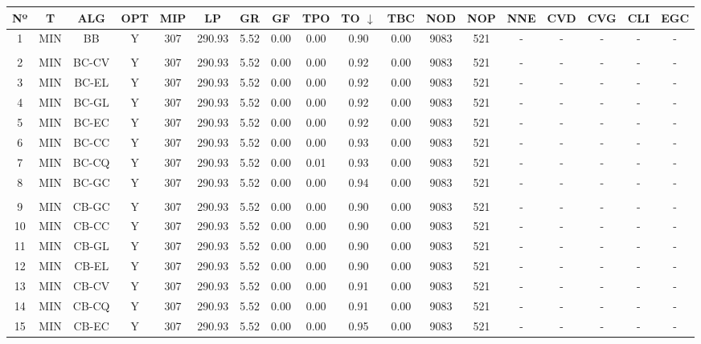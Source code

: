 {
\footnotesize\centering
\hspace*{-5mm}\begin{tabular}{ *{17}{c|} c }
\hline
\textbf{Nº} & \textbf{T} & \textbf{ALG} & \textbf{OPT} & \textbf{MIP} & \textbf{LP} & \textbf{GR} & \textbf{GF} & \textbf{TPO} & \textbf{TO} $\downarrow$ & \textbf{TBC} & \textbf{NOD} & \textbf{NOP} & \textbf{NNE} & \textbf{CVD} & \textbf{CVG} & \textbf{CLI} & \textbf{EGC}\\
\hline
1 & MIN & BB & Y & 307 & 290.93 & 5.52 & 0.00 & 0.00 & 0.90 & 0.00 & 9083 & 521 & - & - & - & - & -\\
\hline
\multicolumn{18}{c}{}
\\
\hline
2 & MIN & BC-CV & Y & 307 & 290.93 & 5.52 & 0.00 & 0.00 & 0.92 & 0.00 & 9083 & 521 & - & - & - & - & -\\
\hline
3 & MIN & BC-EL & Y & 307 & 290.93 & 5.52 & 0.00 & 0.00 & 0.92 & 0.00 & 9083 & 521 & - & - & - & - & -\\
\hline
4 & MIN & BC-GL & Y & 307 & 290.93 & 5.52 & 0.00 & 0.00 & 0.92 & 0.00 & 9083 & 521 & - & - & - & - & -\\
\hline
5 & MIN & BC-EC & Y & 307 & 290.93 & 5.52 & 0.00 & 0.00 & 0.92 & 0.00 & 9083 & 521 & - & - & - & - & -\\
\hline
6 & MIN & BC-CC & Y & 307 & 290.93 & 5.52 & 0.00 & 0.00 & 0.93 & 0.00 & 9083 & 521 & - & - & - & - & -\\
\hline
7 & MIN & BC-CQ & Y & 307 & 290.93 & 5.52 & 0.00 & 0.01 & 0.93 & 0.00 & 9083 & 521 & - & - & - & - & -\\
\hline
8 & MIN & BC-GC & Y & 307 & 290.93 & 5.52 & 0.00 & 0.00 & 0.94 & 0.00 & 9083 & 521 & - & - & - & - & -\\
\hline
\multicolumn{18}{c}{}
\\
\hline
9 & MIN & CB-GC & Y & 307 & 290.93 & 5.52 & 0.00 & 0.00 & 0.90 & 0.00 & 9083 & 521 & - & - & - & - & -\\
\hline
10 & MIN & CB-CC & Y & 307 & 290.93 & 5.52 & 0.00 & 0.00 & 0.90 & 0.00 & 9083 & 521 & - & - & - & - & -\\
\hline
11 & MIN & CB-GL & Y & 307 & 290.93 & 5.52 & 0.00 & 0.00 & 0.90 & 0.00 & 9083 & 521 & - & - & - & - & -\\
\hline
12 & MIN & CB-EL & Y & 307 & 290.93 & 5.52 & 0.00 & 0.00 & 0.90 & 0.00 & 9083 & 521 & - & - & - & - & -\\
\hline
13 & MIN & CB-CV & Y & 307 & 290.93 & 5.52 & 0.00 & 0.00 & 0.91 & 0.00 & 9083 & 521 & - & - & - & - & -\\
\hline
14 & MIN & CB-CQ & Y & 307 & 290.93 & 5.52 & 0.00 & 0.00 & 0.91 & 0.00 & 9083 & 521 & - & - & - & - & -\\
\hline
15 & MIN & CB-EC & Y & 307 & 290.93 & 5.52 & 0.00 & 0.00 & 0.95 & 0.00 & 9083 & 521 & - & - & - & - & -\\
\hline
\end{tabular}\\
\vspace{4mm}
}

